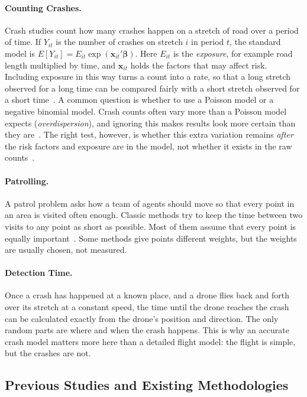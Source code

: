 \documentclass[11pt]{article}
\begin{document}
\paragraph{Counting Crashes.}
Crash studies count how many crashes happen on a stretch of road over a period
of time. If $Y_{it}$ is the number of crashes on stretch $i$ in period $t$, the
standard model is
$E[Y_{it}] = E_{it}\exp(\mathbf{x}_{it}'\boldsymbol{\beta})$. Here
$E_{it}$ is the \emph{exposure}, for example road length multiplied by time, and
$\mathbf{x}_{it}$ holds the factors that may affect risk. Including exposure in
this way turns a count into a rate, so that a long stretch observed for a long
time can be compared fairly with a short stretch observed for a short
time~\cite{washington2020}. A common question is whether to use a Poisson model
or a negative binomial model. Crash counts often vary more than a Poisson model
expects (\emph{overdispersion}), and ignoring this makes results look more
certain than they are~\cite{lordmannering2010,miaou1994}. The right test,
however, is whether this extra variation remains \emph{after} the risk factors
and exposure are in the model, not whether it exists in the raw
counts~\cite{cameron1990,lord2005}.

\paragraph{Patrolling.}
A patrol problem asks how a team of agents should move so that every point in
an area is visited often enough. Classic methods try to keep the time between
two visits to any point as short as possible. Most of them assume that every
point is equally important~\cite{elmaliach2009,portugal2011}. Some methods give
points different weights, but the weights are usually chosen, not measured.

\paragraph{Detection Time.}
Once a crash has happened at a known place, and a drone flies back and forth
over its stretch at a constant speed, the time until the drone reaches the
crash can be calculated exactly from the drone's position and direction. The
only random parts are where and when the crash happens. This is why an accurate
crash model matters more here than a detailed flight model: the flight is
simple, but the crashes are not.

\subsection{Previous Studies and Existing Methodologies}
\end{document}
